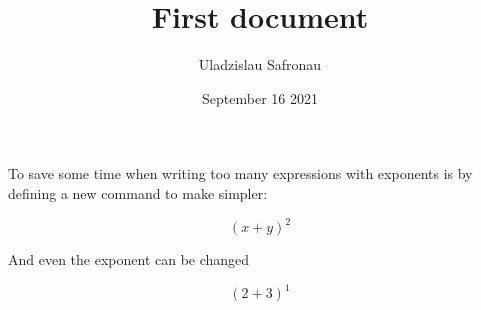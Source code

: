 \documentclass[12pt, a4paper]{article}
\title{First document}
\author{Uladzislau Safronau}
\date{September 16 2021}
\begin{document}
\newcommand{\plusbinomial}[3][2]{(#2 + #3)^#1}

To save some time when writing too many expressions 
with exponents is by defining a new command to make simpler:

\[ \plusbinomial{x}{y} \]

And even the exponent can be changed

\[ \plusbinomial[1]{2}{3} \]
\end{document}
